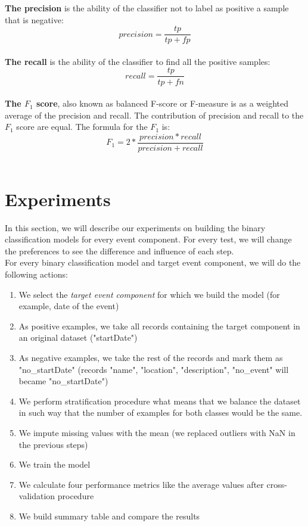\noindent\textbf{The precision} is the ability of the classifier not to label as positive a sample that is negative:
$$precision = \frac{tp}{tp + fp}$$ \\

\noindent\textbf{The recall} is the ability of the classifier to find all the positive samples:
$$recall = \frac{tp}{tp + fn}$$ \\

\noindent\textbf{The $F_1$ score}, also known as balanced F-score or F-measure is as a weighted average of the precision and recall. The contribution of precision and recall to the $F_1$ score are equal. The formula for the $F_1$ is:
$$F_1 = 2 * \frac{precision * recall}{precision + recall}$$\\


\section{Experiments}

In this section, we will describe our experiments on building the binary classification models for every event component. For every test, we will change the preferences to see the difference and influence of each step.\\

For every binary classification model and target event component, we will do the following actions: 
\begin{enumerate}
    \item We select the \textit{target event component} for which we build the model (for example, date of the event)
    \item As positive examples, we take all records containing the target component in an original dataset ("startDate")
    \item As negative examples, we take the rest of the records
    and mark them as "no\_startDate" (records "name", "location", "description", "no\_event" will became "no\_startDate")
    \item We perform stratification procedure what means that we balance the dataset in such way that the number of examples for both classes would be the same.
    \item We impute missing values with the mean (we replaced outliers with NaN in the previous steps)
    \item We train the model
    \item We calculate four performance metrics like the average values after cross-validation procedure
    \item We build summary table and compare the results 
\end{enumerate}

